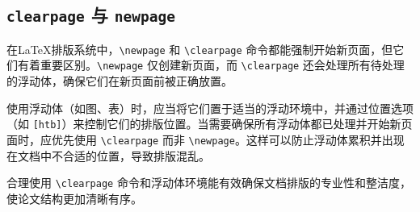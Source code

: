 \subsection{\texttt{clearpage} 与 \texttt{newpage}}

在\LaTeX{}排版系统中，\verb|\newpage| 和 \verb|\clearpage| 命令都能强制开始新页面，但它们有着重要区别。\verb|\newpage| 仅创建新页面，而 \verb|\clearpage| 还会处理所有待处理的浮动体，确保它们在新页面前被正确放置。

使用浮动体（如图、表）时，应当将它们置于适当的浮动环境中，并通过位置选项（如 \verb|[htb]|）来控制它们的排版位置。当需要确保所有浮动体都已处理并开始新页面时，应优先使用 \verb|\clearpage| 而非 \verb|\newpage|。这样可以防止浮动体累积并出现在文档中不合适的位置，导致排版混乱。

合理使用 \verb|\clearpage| 命令和浮动体环境能有效确保文档排版的专业性和整洁度，使论文结构更加清晰有序。

